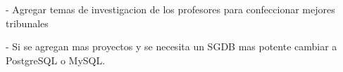 \begin{recomendations}

- Agregar temas de investigacion de los profesores 
para confeccionar mejores tribunales

- Si se agregan mas proyectos y se necesita un SGDB mas potente cambiar a PostgreSQL o MySQL.

\end{recomendations}
